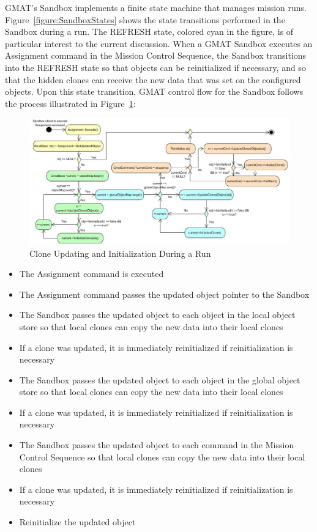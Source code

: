\documentclass[10pt,letterpaper]{article}
\begin{document}
GMAT's Sandbox implements a finite state machine that manages mission runs.  Figure~\ref{figure:SandboxStates} shows the state transitions performed in the Sandbox during a run.  The REFRESH state, colored cyan in the figure, is of particular interest to the current discussion.  When a GMAT Sandbox executes an Assignment command in the Mission Control Sequence, the Sandbox transitions into the REFRESH state so that objects can be reinitialized if necessary, and so that the hidden clones can receive the new data that was set on the configured objects.  Upon this state transition, GMAT control flow for the Sandbox follows the process illustrated in Figure~\ref{figure:SandboxReinitialization}:

\begin{figure}[htb]
\begin{center}
\includegraphics[scale=0.5]{Images/SandboxCloneUpdates.eps}
\caption{\label{figure:SandboxReinitialization}Clone Updating and Initialization During a Run}
\end{center}
\end{figure}

\begin{itemize}
\item The Assignment command is executed
\item The Assignment command passes the updated object pointer to the Sandbox
\item The Sandbox passes the updated object to each object in the local object store so that local clones can copy the new data into their local clones
\item If a clone was updated, it is immediately reinitialized if reinitialization is necessary
\item The Sandbox passes the updated object to each object in the global object store so that local clones can copy the new data into their local clones
\item If a clone was updated, it is immediately reinitialized if reinitialization is necessary
\item The Sandbox passes the updated object to each command in the Mission Control Sequence so that local clones can copy the new data into their local clones
\item If a clone was updated, it is immediately reinitialized if reinitialization is necessary
\item Reinitialize the updated object
\end{itemize}
\end{document}
